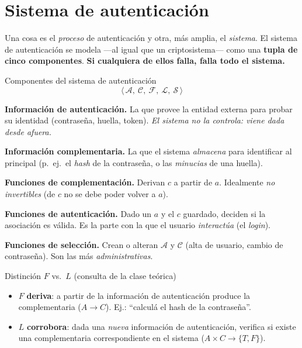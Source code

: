 \documentclass[11pt,a4paper]{article}
\newcommand{\Aset}{\mathcal{A}}
\newcommand{\Cset}{\mathcal{C}}
\newcommand{\Fset}{\mathcal{F}}
\newcommand{\Lset}{\mathcal{L}}
\newcommand{\Sset}{\mathcal{S}}
\begin{document}
\section{Sistema de autenticación}

Una cosa es el \emph{proceso} de autenticación y otra, más amplia, el \emph{sistema}. El
sistema de autenticación se modela —al igual que un criptosistema— como una \textbf{tupla de
cinco componentes}. \textbf{Si cualquiera de ellos falla, falla todo el sistema.}

\begin{defbox}{Componentes del sistema de autenticación}
\[
  \langle\, \Aset,\ \Cset,\ \Fset,\ \Lset,\ \Sset \,\rangle
\]
\begin{description}[leftmargin=2.6em,style=nextline,itemsep=3pt]
  \item[$\Aset = \{a\}$] \textbf{Información de autenticación.} La que provee la entidad
        externa para probar su identidad (contraseña, huella, token). \emph{El sistema no la
        controla: viene dada desde afuera.}
  \item[$\Cset = \{c\}$] \textbf{Información complementaria.} La que el sistema
        \emph{almacena} para identificar al principal (p.\ ej.\ el \emph{hash} de la
        contraseña, o las \emph{minucias} de una huella).
  \item[$\Fset = \{f : \Aset \to \Cset\}$] \textbf{Funciones de complementación.} Derivan
        $c$ a partir de $a$. Idealmente \emph{no invertibles} (de $c$ no se debe poder volver
        a $a$).
  \item[$\Lset = \{\ell : \Aset\times\Cset \to \{0,1\}\}$] \textbf{Funciones de
        autenticación.} Dado un $a$ y el $c$ guardado, deciden si la asociación es válida.
        Es la parte con la que el usuario \emph{interactúa} (el \emph{login}).
  \item[$\Sset = \{s\}$] \textbf{Funciones de selección.} Crean o alteran $\Aset$ y $\Cset$
        (alta de usuario, cambio de contraseña). Son las más \emph{administrativas}.
\end{description}
\end{defbox}

\begin{practbox}{Distinción $F$ vs.\ $L$ (consulta de la clase teórica)}
\begin{itemize}[leftmargin=1.3em,itemsep=2pt]
  \item $F$ \textbf{deriva}: a partir de la información de autenticación produce la
        complementaria ($A \to C$). Ej.: ``calculá el hash de la contraseña''.
  \item $L$ \textbf{corrobora}: dada una \emph{nueva} información de autenticación, verifica
        si existe una complementaria correspondiente en el sistema ($A\times C\to\{T,F\}$).
\end{itemize}
\end{practbox}
\end{document}
